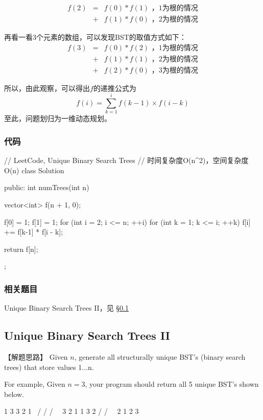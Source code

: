 \begin{eqnarray}
	f(2) &=& f(0) * f(1)   \text{ ，1为根的情况} \nonumber \\
	&+& f(1) * f(0)   \text{ ，2为根的情况} \nonumber
\end{eqnarray}

再看一看3个元素的数组，可以发现BST的取值方式如下：
\begin{eqnarray}
	f(3) &=& f(0) * f(2)   \text{ ，1为根的情况} \nonumber \\
	&+& f(1) * f(1)   \text{ ，2为根的情况} \nonumber \\
	&+& f(2) * f(0)   \text{ ，3为根的情况} \nonumber
\end{eqnarray}

所以，由此观察，可以得出$f$的递推公式为
$$
f(i) = \sum_{k=1}^{i} f(k-1) \times f(i-k)
$$
至此，问题划归为一维动态规划。


\subsubsection{代码}

\begin{Code}
	// LeetCode, Unique Binary Search Trees
	// 时间复杂度O(n^2)，空间复杂度O(n)
	class Solution {
		public:
		int numTrees(int n) {
			vector<int> f(n + 1, 0);
			
			f[0] = 1;
			f[1] = 1;
			for (int i = 2; i <= n; ++i) {
				for (int k = 1; k <= i; ++k)
				f[i] += f[k-1] * f[i - k];
			}
			
			return f[n];
		}
	};
\end{Code}


\subsubsection{相关题目}
\begindot
\item Unique Binary Search Trees II，见 \S \ref{sec:unique-binary-search-trees-ii}
\myenddot


\subsection{Unique Binary Search Trees II}
\label{sec:unique-binary-search-trees-ii}


【解题思路】
Given $n$, generate all structurally unique BST's (binary search trees) that store values 1...n.

For example,
Given $n = 3$, your program should return all 5 unique BST's shown below.
\begin{Code}
	1         3     3      2      1
	\       /     /      / \      \
	3     2     1      1   3      2
	/     /       \                 \
	2     1         2                 3
\end{Code}


